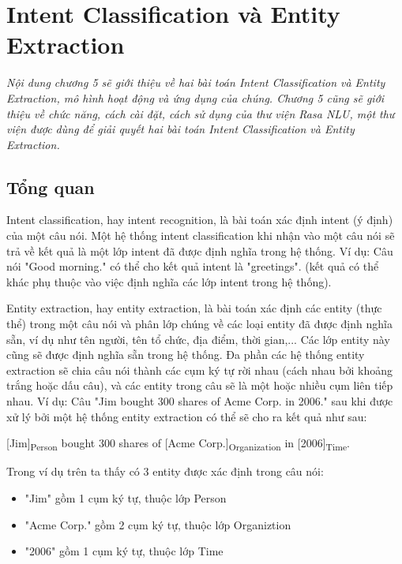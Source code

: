 \chapter{Intent Classification và Entity Extraction}
\ifpdf
    \graphicspath{{Chapter5/Chapter5Figs/PNG/}{Chapter5/Chapter5Figs/PDF/}{Chapter5/Chapter5Figs/}}
\else
    \graphicspath{{Chapter5/Chapter5Figs/EPS/}{Chapter5/Chapter5Figs/}}
\fi

\textit{Nội dung chương 5 sẽ giới thiệu về hai bài toán Intent Classification và Entity Extraction, mô hình hoạt động và ứng dụng của chúng. Chương 5 cũng sẽ giới thiệu về chức năng, cách cài đặt, cách sử dụng của thư viện Rasa NLU, một thư viện được dùng để giải quyết hai bài toán Intent Classification và Entity Extraction.}

\section{Tổng quan}

Intent classification, hay intent recognition, là bài toán xác định intent (ý định) của một câu nói. Một hệ thống intent classification khi nhận vào một câu nói sẽ trả về kết quả là một lớp intent đã được định nghĩa trong hệ thống. Ví dụ: Câu nói "Good morning." có thể cho kết quả intent là "greetings". (kết quả có thể khác phụ thuộc vào việc định nghĩa các lớp intent trong hệ thống).

Entity extraction, hay entity extraction, là bài toán xác định các entity (thực thể) trong một câu nói và phân lớp chúng về các loại entity đã được định nghĩa sẵn, ví dụ như tên người, tên tổ chức, địa điểm, thời gian,... Các lớp entity này cũng sẽ được định nghĩa sẵn trong hệ thống. Đa phần các hệ thống entity extraction sẽ chia câu nói thành các cụm ký tự rời nhau (cách nhau bởi khoảng trắng hoặc dấu câu), và các entity trong câu sẽ là một hoặc nhiều cụm liên tiếp nhau. Ví dụ: Câu "Jim bought 300 shares of Acme Corp. in 2006." sau khi được xử lý bởi một hệ thống entity extraction có thể sẽ cho ra kết quả như sau:

[Jim]\textsubscript{Person} bought 300 shares of [Acme Corp.]\textsubscript{Organization} in [2006]\textsubscript{Time}.

Trong ví dụ trên ta thấy có 3 entity được xác định trong câu nói:
\begin{itemize}
    \item "Jim" gồm 1 cụm ký tự, thuộc lớp Person
    \item "Acme Corp." gồm 2 cụm ký tự, thuộc lớp Organiztion
    \item "2006" gồm 1 cụm ký tự, thuộc lớp Time
\end{itemize}

